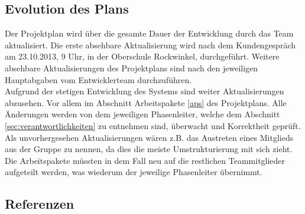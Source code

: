 \documentclass[fontsize=12pt,paper=a4,twoside]{scrartcl}
\begin{document}
\subsection{Evolution des Plans}

Der Projektplan wird über die gesamte Dauer der Entwicklung durch das Team aktualisiert. Die erste absehbare Aktualisierung wird nach dem Kundengespräch am 23.10.2013, 9 Uhr, in der Oberschule Rockwinkel, durchgeführt. Weitere absehbare Aktualisierungen des Projektplans sind nach den jeweiligen Hauptabgaben vom Entwicklerteam durchzuführen. \\
Aufgrund der stetigen Entwicklung des Systems sind weiter Aktualisierungen abzusehen. Vor allem im Abschnitt Arbeitspakete \ref{aps} des Projektplans. Alle Änderungen werden von dem jeweiligen Phasenleiter, welche dem Abschnitt \ref{sec:verantwortlichkeiten} zu entnehmen sind, überwacht und Korrektheit geprüft. Als unvorhergesehen Aktualisierungen wären z.B. das Austreten eines Mitglieds aus der Gruppe zu nennen, da dies die meiste Umstrukturierung mit sich zieht. Die Arbeitspakete müssten in dem Fall neu auf die restlichen Teammitglieder aufgeteilt werden, was wiederum der jeweilige Phasenleiter übernimmt.

\newpage

\subsection{Referenzen}
\end{document}
